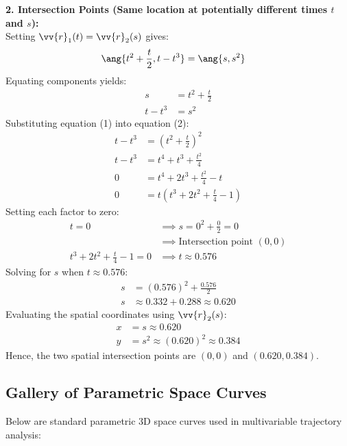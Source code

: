 \begin{sol}
\textbf{2. Intersection Points (Same location at potentially different times $t$ and $s$):} \\
Setting $\vv{r}_1(t) = \vv{r}_2(s)$ gives:
\begin{align*}
\ang{t^2 + \frac{t}{2}, t - t^3} &= \ang{s, s^2}
\end{align*}
Equating components yields:
\begin{align*}
s &= t^2 + \frac{t}{2} \tag{1} \\
t - t^3 &= s^2 \tag{2}
\end{align*}
Substituting equation (1) into equation (2):
\begin{align*}
t - t^3 &= \left(t^2 + \frac{t}{2}\right)^2 \\
t - t^3 &= t^4 + t^3 + \frac{t^2}{4} \\
0 &= t^4 + 2t^3 + \frac{t^2}{4} - t \\
0 &= t\left(t^3 + 2t^2 + \frac{t}{4} - 1\right)
\end{align*}
Setting each factor to zero:
\begin{align*}
t = 0 & \implies s = 0^2 + \frac{0}{2} = 0 \\
&\implies \text{Intersection point } (0, 0) \\
t^3 + 2t^2 + \frac{t}{4} - 1 = 0 & \implies t \approx 0.576
\end{align*}
Solving for $s$ when $t \approx 0.576$:
\begin{align*}
s &= (0.576)^2 + \frac{0.576}{2} \\
s &\approx 0.332 + 0.288 \approx 0.620
\end{align*}
Evaluating the spatial coordinates using $\vv{r}_2(s)$:
\begin{align*}
x &= s \approx 0.620 \\
y &= s^2 \approx (0.620)^2 \approx 0.384
\end{align*}
Hence, the two spatial intersection points are $(0, 0)$ and $(0.620, 0.384)$.
\end{sol}

\subsection{Gallery of Parametric Space Curves}

Below are standard parametric 3D space curves used in multivariable trajectory analysis:

